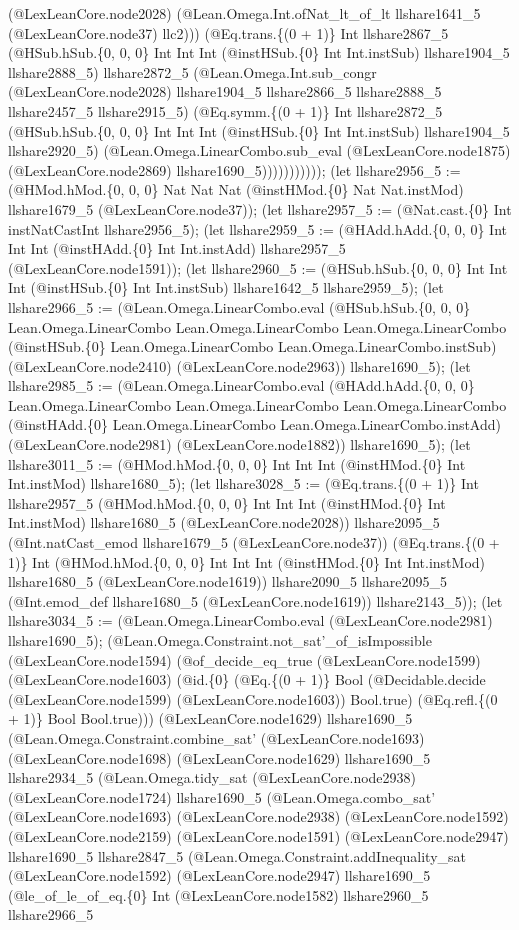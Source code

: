 \documentclass[11pt]{article}
\begin{document}
(@LexLeanCore.node2028) (@Lean.Omega.Int.ofNat\_lt\_of\_lt llshare1641\_5 (@LexLeanCore.node37) llc2))) (@Eq.trans.\{(0 + 1)\} Int llshare2867\_5 (@HSub.hSub.\{0, 0, 0\} Int Int Int (@instHSub.\{0\} Int Int.instSub) llshare1904\_5 llshare2888\_5) llshare2872\_5 (@Lean.Omega.Int.sub\_congr (@LexLeanCore.node2028) llshare1904\_5 llshare2866\_5 llshare2888\_5 llshare2457\_5 llshare2915\_5) (@Eq.symm.\{(0 + 1)\} Int llshare2872\_5 (@HSub.hSub.\{0, 0, 0\} Int Int Int (@instHSub.\{0\} Int Int.instSub) llshare1904\_5 llshare2920\_5) (@Lean.Omega.LinearCombo.sub\_eval (@LexLeanCore.node1875) (@LexLeanCore.node2869) llshare1690\_5))))))))))); (let llshare2956\_5 := (@HMod.hMod.\{0, 0, 0\} Nat Nat Nat (@instHMod.\{0\} Nat Nat.instMod) llshare1679\_5 (@LexLeanCore.node37)); (let llshare2957\_5 := (@Nat.cast.\{0\} Int instNatCastInt llshare2956\_5); (let llshare2959\_5 := (@HAdd.hAdd.\{0, 0, 0\} Int Int Int (@instHAdd.\{0\} Int Int.instAdd) llshare2957\_5 (@LexLeanCore.node1591)); (let llshare2960\_5 := (@HSub.hSub.\{0, 0, 0\} Int Int Int (@instHSub.\{0\} Int Int.instSub) llshare1642\_5 llshare2959\_5); (let llshare2966\_5 := (@Lean.Omega.LinearCombo.eval (@HSub.hSub.\{0, 0, 0\} Lean.Omega.LinearCombo Lean.Omega.LinearCombo Lean.Omega.LinearCombo (@instHSub.\{0\} Lean.Omega.LinearCombo Lean.Omega.LinearCombo.instSub) (@LexLeanCore.node2410) (@LexLeanCore.node2963)) llshare1690\_5); (let llshare2985\_5 := (@Lean.Omega.LinearCombo.eval (@HAdd.hAdd.\{0, 0, 0\} Lean.Omega.LinearCombo Lean.Omega.LinearCombo Lean.Omega.LinearCombo (@instHAdd.\{0\} Lean.Omega.LinearCombo Lean.Omega.LinearCombo.instAdd) (@LexLeanCore.node2981) (@LexLeanCore.node1882)) llshare1690\_5); (let llshare3011\_5 := (@HMod.hMod.\{0, 0, 0\} Int Int Int (@instHMod.\{0\} Int Int.instMod) llshare1680\_5); (let llshare3028\_5 := (@Eq.trans.\{(0 + 1)\} Int llshare2957\_5 (@HMod.hMod.\{0, 0, 0\} Int Int Int (@instHMod.\{0\} Int Int.instMod) llshare1680\_5 (@LexLeanCore.node2028)) llshare2095\_5 (@Int.natCast\_emod llshare1679\_5 (@LexLeanCore.node37)) (@Eq.trans.\{(0 + 1)\} Int (@HMod.hMod.\{0, 0, 0\} Int Int Int (@instHMod.\{0\} Int Int.instMod) llshare1680\_5 (@LexLeanCore.node1619)) llshare2090\_5 llshare2095\_5 (@Int.emod\_def llshare1680\_5 (@LexLeanCore.node1619)) llshare2143\_5)); (let llshare3034\_5 := (@Lean.Omega.LinearCombo.eval (@LexLeanCore.node2981) llshare1690\_5); (@Lean.Omega.Constraint.not\_sat'\_of\_isImpossible (@LexLeanCore.node1594) (@of\_decide\_eq\_true (@LexLeanCore.node1599) (@LexLeanCore.node1603) (@id.\{0\} (@Eq.\{(0 + 1)\} Bool (@Decidable.decide (@LexLeanCore.node1599) (@LexLeanCore.node1603)) Bool.true) (@Eq.refl.\{(0 + 1)\} Bool Bool.true))) (@LexLeanCore.node1629) llshare1690\_5 (@Lean.Omega.Constraint.combine\_sat' (@LexLeanCore.node1693) (@LexLeanCore.node1698) (@LexLeanCore.node1629) llshare1690\_5 llshare2934\_5 (@Lean.Omega.tidy\_sat (@LexLeanCore.node2938) (@LexLeanCore.node1724) llshare1690\_5 (@Lean.Omega.combo\_sat' (@LexLeanCore.node1693) (@LexLeanCore.node2938) (@LexLeanCore.node1592) (@LexLeanCore.node2159) (@LexLeanCore.node1591) (@LexLeanCore.node2947) llshare1690\_5 llshare2847\_5 (@Lean.Omega.Constraint.addInequality\_sat (@LexLeanCore.node1592) (@LexLeanCore.node2947) llshare1690\_5 (@le\_of\_le\_of\_eq.\{0\} Int (@LexLeanCore.node1582) llshare2960\_5 llshare2966\_5 
\end{document}
